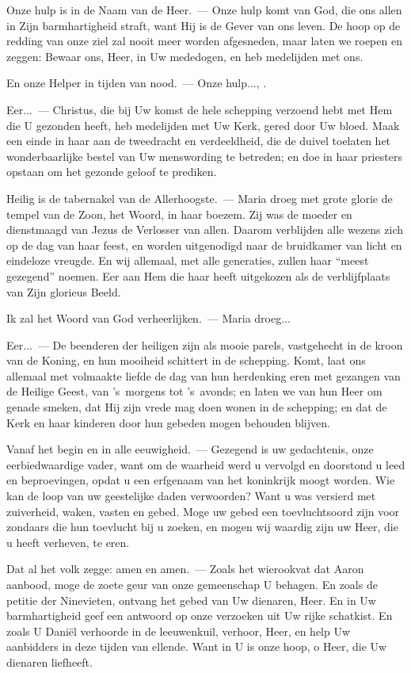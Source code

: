 \documentclass[12pt,twoside,a5paper]{article}
\begin{document}
\begin{halfparskip}
   Onze hulp is in de Naam van de Heer.~--- Onze hulp komt van God, die ons allen in Zijn barmhartigheid straft, want Hij is de Gever van ons leven. De hoop op de redding van onze ziel zal nooit meer worden afgesneden, maar laten we roepen en zeggen: Bewaar ons, Heer, in Uw mededogen, en heb medelijden met ons.

  En onze Helper in tijden van nood.~--- Onze hulp..., .

  Eer...~--- Christus, die bij Uw komst de hele schepping verzoend hebt met Hem die U gezonden heeft, heb medelijden met Uw Kerk, gered door Uw bloed. Maak een einde in haar aan de tweedracht en verdeeldheid, die de duivel toelaten het wonderbaarlijke bestel van Uw menswording te betreden; en doe in haar priesters opstaan om het gezonde geloof te prediken.
\end{halfparskip}

\begin{halfparskip}
   Heilig is de tabernakel van de Allerhoogste.~--- Maria droeg met grote glorie de tempel van de Zoon, het Woord, in haar boezem. Zij was de moeder en dienstmaagd van Jezus de Verlosser van allen. Daarom verblijden alle wezens zich op de dag van haar feest, en worden uitgenodigd naar de bruidkamer van licht en eindeloze vreugde. En wij allemaal, met alle generaties, zullen haar ``meest gezegend'' noemen. Eer aan Hem die haar heeft uitgekozen als de verblijfplaats van Zijn glorieus Beeld.

  Ik zal het Woord van God verheerlijken.~--- Maria droeg...

  Eer...~--- De beenderen der heiligen zijn als mooie parels, vastgehecht in de kroon van de Koning, en hun mooiheid schittert in de schepping. Komt, laat ons allemaal met volmaakte liefde de dag van hun herdenking eren met gezangen van de Heilige Geest, van 's~morgens tot 's~avonds; en laten we van hun Heer om genade smeken, dat Hij zijn vrede mag doen wonen in de schepping; en dat de Kerk en haar kinderen door hun gebeden
  mogen behouden blijven.

  Vanaf het begin en in alle eeuwigheid.~--- Gezegend is uw gedachtenis, onze eerbiedwaardige vader, want om de waarheid werd u vervolgd en doorstond u leed en beproevingen, opdat u een erfgenaam van het koninkrijk moogt worden. Wie kan de loop van uw geestelijke daden verwoorden? Want u was versierd met zuiverheid, waken, vasten en gebed. Moge uw gebed een toevluchtsoord zijn voor zondaars die hun toevlucht bij u zoeken, en mogen wij waardig zijn uw Heer, die u heeft verheven, te eren.

  Dat al het volk zegge: amen en amen.~--- Zoals het wierookvat dat Aaron aanbood, moge de zoete geur van onze gemeenschap U behagen. En zoals de petitie der Ninevieten, ontvang het gebed van Uw dienaren, Heer. En in Uw barmhartigheid geef een antwoord op onze verzoeken uit Uw rijke schatkist. En zoals U Daniël verhoorde in de leeuwenkuil, verhoor, Heer, en help Uw aanbidders in deze tijden van ellende. Want in U is onze hoop, o Heer, die Uw dienaren liefheeft.
\end{halfparskip}
\end{document}
